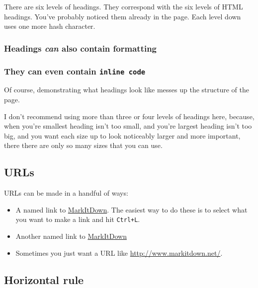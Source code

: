 There are six levels of headings. They correspond with the six levels of
HTML headings. You've probably noticed them already in the page. Each
level down uses one more hash character.

\hypertarget{headings-can-also-contain-formatting}{%
\subsubsection{\texorpdfstring{Headings \emph{can} also contain
\textbf{formatting}}{Headings can also contain formatting}}\label{headings-can-also-contain-formatting}}

\hypertarget{they-can-even-contain-inline-code}{%
\subsubsection{\texorpdfstring{They can even contain
\texttt{inline\ code}}{They can even contain inline code}}\label{they-can-even-contain-inline-code}}

Of course, demonstrating what headings look like messes up the structure
of the page.

I don't recommend using more than three or four levels of headings here,
because, when you're smallest heading isn't too small, and you're
largest heading isn't too big, and you want each size up to look
noticeably larger and more important, there there are only so many sizes
that you can use.

\hypertarget{urls}{%
\subsection{URLs}\label{urls}}

URLs can be made in a handful of ways:

\begin{itemize}
\tightlist
\item
  A named link to \href{http://www.markitdown.net/}{MarkItDown}. The
  easiest way to do these is to select what you want to make a link and
  hit \texttt{Ctrl+L}.
\item
  Another named link to \href{http://www.markitdown.net/}{MarkItDown}
\item
  Sometimes you just want a URL like \url{http://www.markitdown.net/}.
\end{itemize}

\hypertarget{horizontal-rule}{%
\subsection{Horizontal rule}\label{horizontal-rule}}

